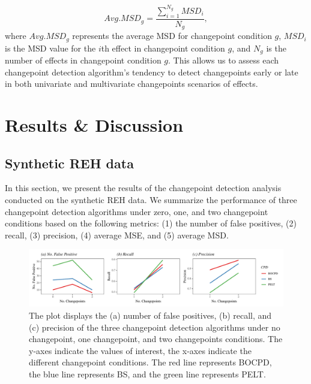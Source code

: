 \documentclass[]{interact}
\theoremstyle{plain}%
\theoremstyle{definition}
\theoremstyle{remark}
\begin{document}
	\begin{equation} \label{12}
		Avg.MSD_g = \frac{\sum_{i=1}^{N_g} MSD_i}{N_g},
	\end{equation}
	where $Avg.MSD_g$ represents the average MSD for changepoint condition $g$, $MSD_i$ is the MSD value for the $i$th effect in changepoint condition $g$, and $N_g$ is the number of effects in changepoint condition $g$. This allows us to assess each changepoint detection algorithm's tendency to detect changepoints early or late in both univariate and multivariate changepoints scenarios of effects.
	
	\section{\fontsize{14}{15}\selectfont Results \& Discussion} \label{sec:results}
	
	\subsection{Synthetic REH data} \label{res:simulation}
	
	\hspace{0.28cm} In this section, we present the results of the changepoint detection analysis conducted on the synthetic REH data. We summarize the performance of three changepoint detection algorithms under zero, one, and two changepoint conditions based on the following metrics: (1) the number of false positives, (2) recall, (3) precision, (4) average MSE, and (5) average MSD.
	
	\begin{figure}[H]
		\captionsetup{justification=raggedright}
		\renewcommand{\figurename}{Figure}
		\centering
		\includegraphics[width=\textwidth,height=\textheight,keepaspectratio]{FPTPRPPV}
		\caption{\fontsize{8}{10}\selectfont The plot displays the (a) number of false positives, (b) recall, and (c) precision of the three changepoint detection algorithms under no changepoint, one changepoint, and two changepoints conditions. The y-axes indicate the values of interest, the x-axes indicate the different changepoint conditions. The red line represents BOCPD, the blue line represents BS, and the green line represents PELT.}
		\label{Figure 3}
	\end{figure}
	
\end{document}
